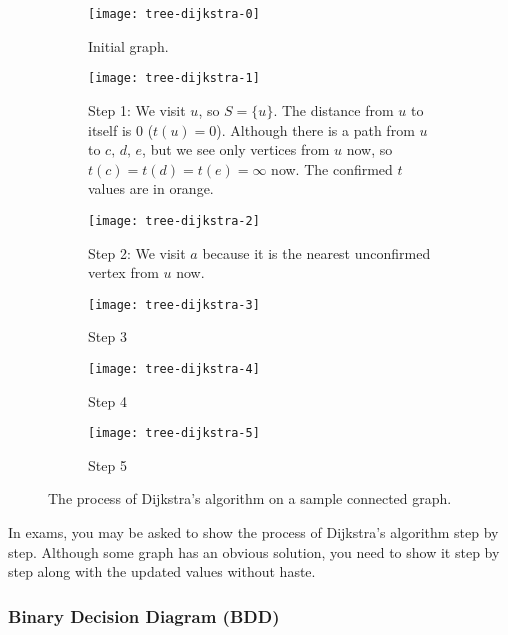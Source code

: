\documentclass[../src/handouts/main.tex]{subfiles}
\begin{document}
\begin{figure}[htbp]
  \centering
  \begin{subfigure}[t]{.45\textwidth}
    \centering
    \texttt{[image: tree-dijkstra-0]}
    \caption{Initial graph.}
    \label{fig:tree-dijkstra-0}
  \end{subfigure}
  \hfill
  \begin{subfigure}[t]{.45\textwidth}
    \centering
    \texttt{[image: tree-dijkstra-1]}
    \caption{Step 1: We visit $u$, so $S = \{ u \}$. The distance from $u$ to itself is 0 ($t(u) = 0$). Although there is a path from $u$ to $c,\, d,\, e$, but we see only vertices from $u$ now, so $t(c) = t(d) = t(e) = \infty$ now. The confirmed $t$ values are in orange.}
    \label{fig:tree-dijkstra-1}
  \end{subfigure}

  \begin{subfigure}[t]{.45\textwidth}
    \centering
    \texttt{[image: tree-dijkstra-2]}
    \caption{Step 2: We visit $a$ because it is the nearest unconfirmed vertex from $u$ now.}
    \label{fig:tree-dijkstra-2}
  \end{subfigure}
  \hfill
  \begin{subfigure}[t]{.45\textwidth}
    \centering
    \texttt{[image: tree-dijkstra-3]}
    \caption{Step 3}
    \label{fig:tree-dijkstra-3}
  \end{subfigure}

  \begin{subfigure}[t]{.45\textwidth}
    \centering
    \texttt{[image: tree-dijkstra-4]}
    \caption{Step 4}
    \label{fig:tree-dijkstra-4}
  \end{subfigure}
  \hfill
  \begin{subfigure}[t]{.45\textwidth}
    \centering
    \texttt{[image: tree-dijkstra-5]}
    \caption{Step 5}
    \label{fig:tree-dijkstra-5}
  \end{subfigure}

  \caption{The process of Dijkstra's algorithm on a sample connected graph.}
  \label{fig:tree-dijkstra}
\end{figure}

In exams, you may be asked to show the process of Dijkstra's algorithm step by step. Although some graph has an obvious solution, you need to show it step by step along with the updated values without haste.

\subsubsection{Binary Decision Diagram (BDD)}
\end{document}
